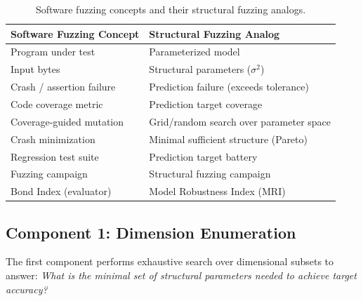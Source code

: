 \documentclass[manuscript,review,anonymous]{acmart}
\begin{document}
\begin{table}[t]
\centering
\caption{Software fuzzing concepts and their structural fuzzing analogs.}
\label{tab:se_analogy}
\small
\begin{tabular}{@{}ll@{}}
\toprule
\textbf{Software Fuzzing Concept} & \textbf{Structural Fuzzing Analog} \\
\midrule
Program under test & Parameterized model \\
Input bytes & Structural parameters ($\sigma^2$) \\
Crash / assertion failure & Prediction failure (exceeds tolerance) \\
Code coverage metric & Prediction target coverage \\
Coverage-guided mutation & Grid/random search over parameter space \\
Crash minimization & Minimal sufficient structure (Pareto) \\
Regression test suite & Prediction target battery \\
Fuzzing campaign & Structural fuzzing campaign \\
Bond Index (evaluator) & Model Robustness Index (MRI) \\
\bottomrule
\end{tabular}
\end{table}

\subsection{Component 1: Dimension Enumeration}

The first component performs exhaustive search over dimensional subsets to answer: \emph{What is the minimal set of structural parameters needed to achieve target accuracy?}
\end{document}

